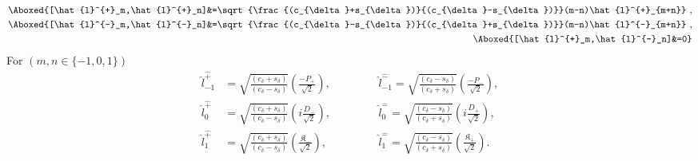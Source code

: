 \documentclass[]{article}
\numberwithin{equation}{section}
\begin{document}
{{\begin{align}
     \Aboxed{[\hat{l}^{+}_m,\hat{l}^{+}_n]&=\sqrt{\frac{(c_{\delta}+s_{\delta})}{(c_{\delta}-s_{\delta})}}(m-n)\hat{l}^{+}_{m+n}}~,\\
    \Aboxed{[\hat{l}^{-}_m,\hat{l}^{-}_n]&=\sqrt{\frac{(c_{\delta}-s_{\delta})}{(c_{\delta}+s_{\delta})}}(m-n)\hat{l}^{-}_{m+n}}~,\\
    \Aboxed{[\hat{l}^{+}_m,\hat{l}^{-}_n]&=0}
\end{align}
For $(m,n\in\{-1,0,1\})$
\begin{align}
    \hat{l}^{\hat{+}}_{-1}&=\sqrt{\frac{(c_{\delta}+s_{\delta})}{(c_{\delta}-s_{\delta})}}\left(\frac{-P_{+}}{\sqrt{2}}\right),~~~~~~~~~~~~&&\hat{l}^{\hat{-}}_{-1}=\sqrt{\frac{(c_{\delta}-s_{\delta})}{(c_{\delta}+s_{\delta})}}\left(\frac{-P_{-}}{\sqrt{2}}\right),\\
    \hat{l}^{\hat{+}}_{0}&=\sqrt{\frac{(c_{\delta}+s_{\delta})}{(c_{\delta}-s_{\delta})}}\left(i\frac{D_{-}}{\sqrt{2}}\right),~~~~~~~~~~~~&&\hat{l}^{\hat{-}}_{0}=\sqrt{\frac{(c_{\delta}-s_{\delta})}{(c_{\delta}+s_{\delta})}}\left(i\frac{D_{+}}{\sqrt{2}}\right),\\
    \hat{l}^{\hat{+}}_{1}&=\sqrt{\frac{(c_{\delta}+s_{\delta})}{(c_{\delta}-s_{\delta})}}\left(\frac{\mathfrak{K}_{-}}{\sqrt{2}}\right),~~~~~~~~~~~~&&\hat{l}^{\hat{-}}_{1}=\sqrt{\frac{(c_{\delta}-s_{\delta})}{(c_{\delta}+s_{\delta})}}\left(\frac{\mathfrak{K}_{+}}{\sqrt{2}}\right).
\end{align}


\pagebreak
}}
\end{document}

